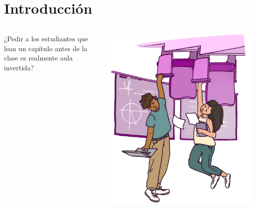 \section{Introducción}

\begin{frame}
    \begin{columns}
    \begin{block}{}\centering\Large
        ¿Pedir a los estudiantes que lean un capítulo antes de la clase es realmente aula invertida?
    \end{block}      
        \begin{center}
        \includegraphics[width=1\linewidth]{Figuras/Fig01.png}
        \end{center}
    \end{columns}

\end{frame}

